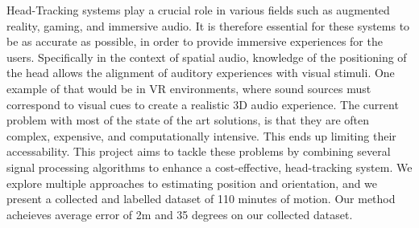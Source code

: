 Head-Tracking systems play a crucial role in various fields such as augmented reality, gaming, and immersive audio. It is therefore essential for these systems to be as accurate as possible, in order to provide immersive experiences for the users. Specifically in the context of spatial audio, knowledge of the positioning of the head allows the alignment of auditory experiences with visual stimuli. One example of that would be in VR environments, where sound sources must correspond to visual cues to create a realistic 3D audio experience. The current problem with most of the state of the art solutions, is that they are often complex, expensive, and computationally intensive. This ends up limiting their accessability.  This project aims to tackle these problems by combining several signal processing algorithms to enhance a cost-effective, head-tracking system. We explore multiple approaches to estimating position and orientation, and we present a collected and labelled dataset of 110 minutes of motion. Our method acheieves average error of 2m and 35 degrees on our collected dataset.